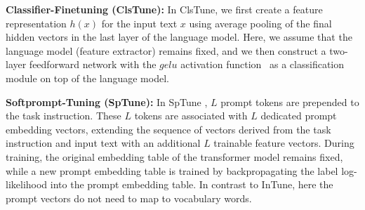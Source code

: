 \documentclass[11pt]{article}
\begin{document}

\textbf{Classifier-Finetuning (ClsTune):} In ClsTune, we first create a feature representation $h(x)$ for the input text $x$ using average pooling of the final hidden vectors in the last layer of the language model. Here, we assume that the language model (feature extractor) remains fixed, and we then construct a two-layer feedforward network with the $gelu$ activation function~\cite{DBLP:journals/corr/HendrycksG16} as a classification module on top of the language model.

\textbf{Softprompt-Tuning (SpTune):} In SpTune \cite{lester-etal-2021-power}, $L$ prompt tokens are prepended to the task instruction. These $L$ tokens are associated with $L$ dedicated prompt embedding vectors, extending the sequence of vectors derived from the task instruction and input text with an additional $L$ trainable feature vectors. During training, the original embedding table of the transformer model remains fixed, while a new prompt embedding table is trained by backpropagating the label log-likelihood into the prompt embedding table. In contrast to InTune, here the prompt vectors do not need to map to vocabulary words.

\end{document}
